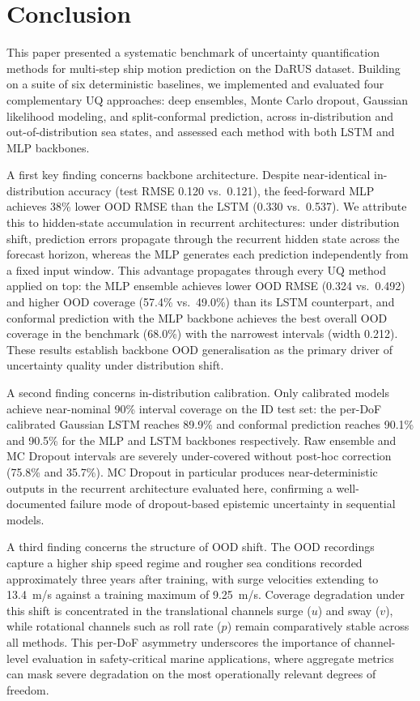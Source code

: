 \documentclass[a4paper,fleqn]{cas-sc}
\begin{document}
\section{Conclusion}

This paper presented a systematic benchmark of uncertainty quantification methods for multi-step ship motion prediction on the DaRUS dataset. Building on a suite of six deterministic baselines, we implemented and evaluated four complementary UQ approaches: deep ensembles, Monte Carlo dropout, Gaussian likelihood modeling, and split-conformal prediction, across in-distribution and out-of-distribution sea states, and assessed each method with both LSTM and MLP backbones.

A first key finding concerns backbone architecture. Despite near-identical in-distribution accuracy (test RMSE 0.120 vs.\ 0.121), the feed-forward MLP achieves 38\% lower OOD RMSE than the LSTM (0.330 vs.\ 0.537). We attribute this to hidden-state accumulation in recurrent architectures: under distribution shift, prediction errors propagate through the recurrent hidden state across the forecast horizon, whereas the MLP generates each prediction independently from a fixed input window. This advantage propagates through every UQ method applied on top: the MLP ensemble achieves lower OOD RMSE (0.324 vs.\ 0.492) and higher OOD coverage (57.4\% vs.\ 49.0\%) than its LSTM counterpart, and conformal prediction with the MLP backbone achieves the best overall OOD coverage in the benchmark (68.0\%) with the narrowest intervals (width 0.212). These results establish backbone OOD generalisation as the primary driver of uncertainty quality under distribution shift.

A second finding concerns in-distribution calibration. Only calibrated models achieve near-nominal 90\% interval coverage on the ID test set: the per-DoF calibrated Gaussian LSTM reaches 89.9\% and conformal prediction reaches 90.1\% and 90.5\% for the MLP and LSTM backbones respectively. Raw ensemble and MC Dropout intervals are severely under-covered without post-hoc correction (75.8\% and 35.7\%). MC Dropout in particular produces near-deterministic outputs in the recurrent architecture evaluated here, confirming a well-documented failure mode of dropout-based epistemic uncertainty in sequential models.

A third finding concerns the structure of OOD shift. The OOD recordings capture a higher ship speed regime and rougher sea conditions recorded approximately three years after training, with surge velocities extending to 13.4~m/s against a training maximum of 9.25~m/s. Coverage degradation under this shift is concentrated in the translational channels surge ($u$) and sway ($v$), while rotational channels such as roll rate ($p$) remain comparatively stable across all methods. This per-DoF asymmetry underscores the importance of channel-level evaluation in safety-critical marine applications, where aggregate metrics can mask severe degradation on the most operationally relevant degrees of freedom.
\end{document}
